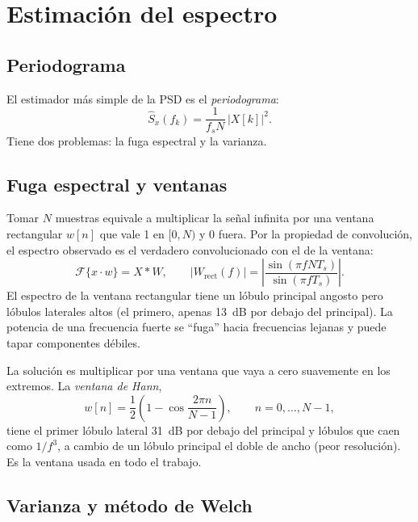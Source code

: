 \section{Estimación del espectro}

\subsection{Periodograma}

El estimador más simple de la PSD es el \emph{periodograma}:
\begin{equation}
  \hat S_x(f_k) = \frac{1}{f_s N}\, |X[k]|^2.
\end{equation}
Tiene dos problemas: la fuga espectral y la varianza.

\subsection{Fuga espectral y ventanas}
\label{sec:fuga}

Tomar $N$ muestras equivale a multiplicar la señal infinita por una ventana rectangular $w[n]$ que vale
1 en $[0, N)$ y 0 fuera. Por la propiedad de convolución, el espectro observado es
el verdadero convolucionado con el de la ventana:
\begin{equation}
  \mathcal{F}\{x\cdot w\} = X * W, \qquad
  |W_{\text{rect}}(f)| = \left|\frac{\sin(\pi f N T_s)}{\sin(\pi f T_s)}\right|.
\end{equation}
El espectro de la ventana rectangular tiene un lóbulo principal angosto pero lóbulos laterales altos (el
primero, apenas 13~dB por debajo del principal). La potencia de una frecuencia fuerte se ``fuga'' hacia
frecuencias lejanas y puede tapar componentes débiles.

La solución es multiplicar por una ventana que vaya a cero suavemente en los extremos. La
\emph{ventana de Hann},
\begin{equation}
  w[n] = \frac12\left(1 - \cos\frac{2\pi n}{N-1}\right), \qquad n = 0, \dots, N-1,
\end{equation}
tiene el primer lóbulo lateral 31~dB por debajo del principal y lóbulos que caen como $1/f^3$, a
cambio de un lóbulo principal el doble de ancho (peor resolución). Es la ventana usada en todo el trabajo.

\subsection{Varianza y método de Welch}

